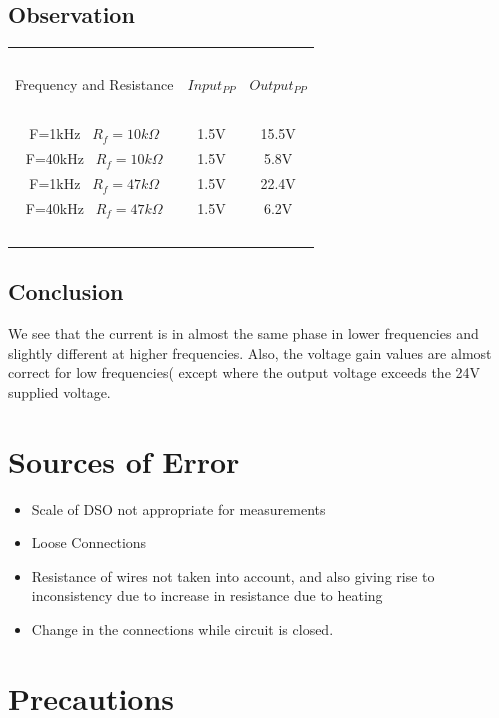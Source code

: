 \documentclass{article}
\begin{document}
\subsection{Observation}
\begin{center}
\begin{tabular}{| c | c | c |} 
 \hline
    \ & \ & \ \\
    Frequency and Resistance & $Input_{PP}$ & $Output_{PP}$ \\ [1em]
    \hline
    \ & \ & \ \\
    F=1kHz \ $R_f=10k\Omega$  & 1.5V & 15.5V \\
    F=40kHz \ $R_f=10k\Omega$  & 1.5V & 5.8V \\
    F=1kHz \ $R_f=47k\Omega$  & 1.5V & 22.4V \\
    F=40kHz \ $R_f=47k\Omega$  & 1.5V & 6.2V \\
    \ & \ & \ \\
 \hline
\end{tabular}
\end{center}

\subsection{Conclusion}
We see that the current is in almost the same phase in lower frequencies and slightly different at higher frequencies. Also, the voltage gain values are almost correct for low frequencies( except where the output voltage exceeds the 24V supplied voltage.


\newpage
\vspace{10px}
\section{Sources of Error}
\begin{itemize}
\item Scale of DSO not appropriate for measurements
\item Loose Connections
\item Resistance of wires not taken into account, and also giving rise to inconsistency due to increase in resistance due to heating
\item Change in the connections while circuit is closed.

\end{itemize}

\vspace{5px}

\section{Precautions}
\end{document}
